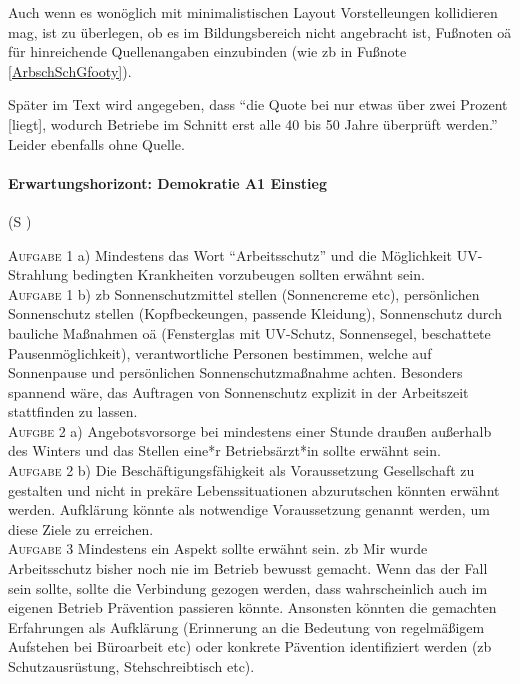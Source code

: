 Auch wenn es wonöglich mit minimalistischen Layout Vorstelleungen kollidieren mag, ist zu überlegen, ob es im Bildungsbereich nicht angebracht ist, Fußnoten \gls{oä} für hinreichende Quellenangaben einzubinden (wie \gls{zb} in Fußnote \ref{ArbschSchGfooty}). 


Später im Text wird angegeben, dass \enquote{die Quote bei nur etwas über zwei Prozent [liegt], wodurch Betriebe im Schnitt erst alle 40 bis 50 Jahre überprüft werden.} Leider ebenfalls ohne Quelle.



\paragraph{Erwartungshorizont: Demokratie A1 Einstieg} (\gls{S} \pageref{DEMOKRATIE-A1})

\textsc{Aufgabe 1} a) \quad
Mindestens das Wort \enquote{Arbeitsschutz} und die Möglichkeit UV-Strahlung bedingten Krankheiten vorzubeugen sollten erwähnt sein. 
\\

\textsc{Aufgabe 1} b) \quad
\Gls{zb} Sonnenschutzmittel stellen (Sonnencreme \gls{etc}), persönlichen Sonnenschutz stellen (Kopfbeckeungen, passende Kleidung), Sonnenschutz durch bauliche Maßnahmen \gls{oä} (Fensterglas mit UV-Schutz, Sonnensegel, beschattete Pausenmöglichkeit), verantwortliche Personen bestimmen, welche auf Sonnenpause und persönlichen Sonnenschutzmaßnahme achten. 
Besonders spannend wäre, das Auftragen von Sonnenschutz explizit in der Arbeitszeit stattfinden zu lassen. 
\\

\textsc{Aufgbe 2} a) \quad
Angebotsvorsorge bei mindestens einer Stunde draußen außerhalb des Winters und das Stellen eine*r Betriebsärzt*in sollte erwähnt sein. 
\\

\textsc{Aufgabe 2} b) \quad
Die Beschäftigungsfähigkeit als Voraussetzung Gesellschaft zu gestalten und nicht in prekäre Lebenssituationen abzurutschen könnten erwähnt werden. 
Aufklärung könnte als notwendige Voraussetzung genannt werden, um diese Ziele zu erreichen.
\\

\textsc{Aufgabe 3} \quad
Mindestens ein Aspekt sollte erwähnt sein. \Gls{zb} Mir wurde Arbeitsschutz bisher noch nie im Betrieb bewusst gemacht.
Wenn das der Fall sein sollte, sollte die Verbindung gezogen werden, dass wahrscheinlich auch im eigenen Betrieb Prävention passieren könnte. 
Ansonsten könnten die gemachten Erfahrungen als Aufklärung (Erinnerung an die Bedeutung von regelmäßigem Aufstehen bei Büroarbeit \gls{etc}) oder konkrete Pävention identifiziert werden (\gls{zb} Schutzausrüstung, Stehschreibtisch \gls{etc}).



